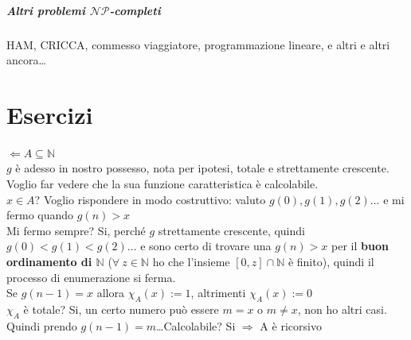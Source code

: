 \documentclass[10pt]{book}
\begin{document}
\paragraph{Altri problemi $\mathscr{NP}$-completi} HAM, CRICCA, commesso viaggiatore, programmazione lineare, e altri e altri ancora\ldots
\chapter{Esercizi}
$\Leftarrow A\subseteq \mathbb{N}$\\
$g$ è adesso in nostro possesso, nota per ipotesi, totale e strettamente crescente.
Voglio far vedere che la sua funzione caratteristica è calcolabile.\\
$x\in A$? Voglio rispondere in modo costruttivo: valuto $g(0), g(1), g(2)\ldots$ e mi fermo quando $g(n) > x$\\
Mi fermo sempre? Si, perché $g$ strettamente crescente, quindi $g(0) < g(1) < g(2)\ldots$ e sono certo di trovare una $g(n) > x$ per il \textbf{buon ordinamento di $\mathbb{N}$} ($\forall\:z\in\mathbb{N}$ ho che l'insieme $[0, z] \cap \mathbb{N}$ è finito), quindi il processo di enumerazione si ferma.\\
Se $g(n-1) = x$ allora $\chi_A(x) := 1$, altrimenti $\chi_A(x) := 0$\\
$\chi_A$ è totale? Si, un certo numero può essere $m = x$ o $m \neq x$, non ho altri casi. Quindi prendo $g(n-1) = m$\ldots Calcolabile? Si $\Rightarrow$ A è ricorsivo
\end{document}
